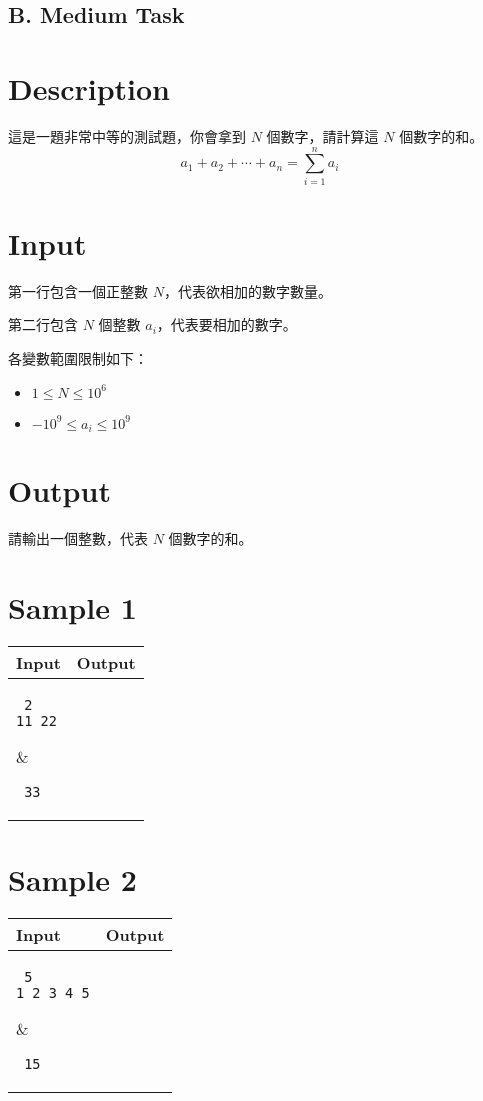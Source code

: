 \documentclass[11pt,a4paper]{article}
\begin{document}
\begin{center}
\section*{B. Medium Task}
\end{center}

\section*{Description}

這是一題非常中等的測試題，你會拿到 $N$ 個數字，請計算這 $N$ 個數字的和。
$$
	a_1 + a_2 + \cdots + a_n = \sum_{i=1}^n a_i
$$

\section*{Input}

第一行包含一個正整數 $N$，代表欲相加的數字數量。 

第二行包含 $N$ 個整數 $a_i$，代表要相加的數字。

各變數範圍限制如下：
\begin{itemize}
	\item $1 \le N \le 10^6$ 
	\item $-10^9 \le a_i \le 10^9$ 
\end{itemize}

\section*{Output}

請輸出一個整數，代表 $N$ 個數字的和。

\section*{Sample 1}
\begin{longtable}[!h]{|p{}|p{}|}
\hline
\textbf {Input}	& \textbf {Output} \\
\hline
\parbox[t]{0.5\textwidth} %
{ \tt
2 \\ 
11 22 \\
} &
\parbox[t]{0.5\textwidth}
{ \tt
33 \\
} \\
\hline
\end{longtable}

\section*{Sample 2}
\begin{longtable}[!h]{|p{}|p{}|}
\hline
\textbf {Input}	& \textbf {Output} \\
\hline
\parbox[t]{0.5\textwidth} %
{ \tt
5 \\
1 2 3 4 5 \\ 
} &
\parbox[t]{0.5\textwidth}
{ \tt
15 \\
} \\
\hline
\end{longtable}
\end{document}
